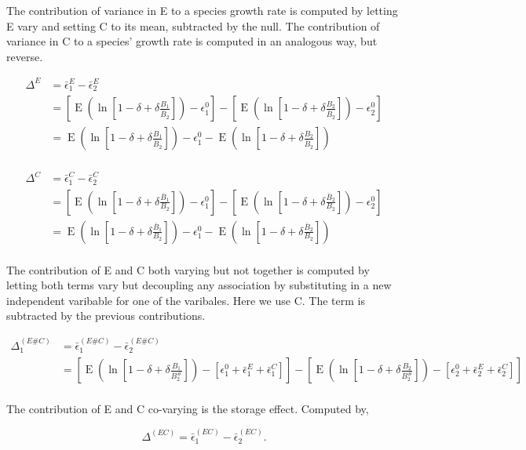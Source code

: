 \documentclass[letterpaper,11pt]{article}
\DeclareMathOperator{\EX}{E}%
\begin{document}
The contribution of variance in E to a species growth rate is computed by letting E vary and setting C to its mean, subtracted by the null. The contribution of variance in C to a species' growth rate is computed in an analogous way, but reverse.

\begin{align}
\Delta^E &= \bar \epsilon_1^E - \bar \epsilon_2^E\\
&=[\EX (\ln[1-\delta + \delta \frac{B_1}{\bar B_2}]) - \epsilon_1^0] - [\EX(\ln[1-\delta + \delta \frac{ B_2}{\bar B_2}]) - \epsilon_2^0]\\
&=\EX (\ln[1-\delta + \delta \frac{B_1}{\bar B_2}]) - \epsilon_1^0 - \EX(\ln[1-\delta + \delta \frac{ B_2}{\bar B_2}]) \\
\end{align}

\begin{align}
\Delta^C &= \bar \epsilon_1^C - \bar \epsilon_2^C\\
&=[\EX (\ln[1-\delta + \delta \frac{\bar B_1}{B_2}]) - \epsilon_1^0] - [\EX(\ln[1-\delta + \delta \frac{\bar B_2}{B_2}]) - \epsilon_2^0]\\
&=\EX (\ln[1-\delta + \delta \frac{\bar B_1}{B_2}]) - \epsilon_1^0 - \EX(\ln[1-\delta + \delta \frac{\bar B_2}{B_2}]) \\
\end{align}


The contribution of E and C both varying but not together is computed by letting both terms vary but decoupling any association by substituting in a new independent varibable for one of the varibales. Here we use C. The term is subtracted by the previous contributions.

\begin{align}
\Delta_1^{(E\#C)} &= \bar \epsilon_1^{(E\#C)} - \bar \epsilon_2^{(E\#C)}\\
&=[\EX(\ln[1-\delta + \delta \frac{B_1}{B_2^{\#}}]) -[\epsilon_1^0 +\bar \epsilon_1^E + \bar \epsilon_1^C]] - [\EX(\ln[1-\delta + \delta \frac{B_2}{B_2^{\#}}]) -[\epsilon_2^0 +\bar \epsilon_2^E + \bar \epsilon_2^C]]\\
\end{align}

The contribution of E and C co-varying is the storage effect. Computed by, 

\begin{equation}
\Delta^{(EC)} = \bar \epsilon_1^{(EC)} - \bar \epsilon_2^{(EC)}.
\end{equation}
\end{document}
